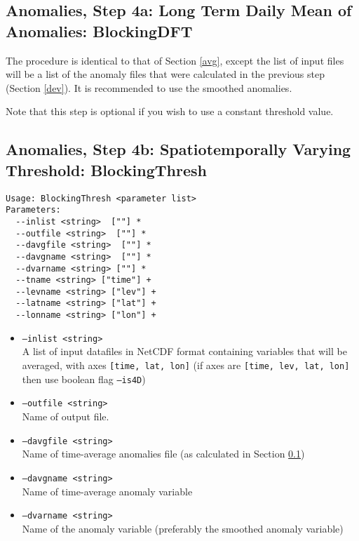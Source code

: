 \documentclass{article}
\begin{document}
\subsection{Anomalies, Step 4a: Long Term Daily Mean of Anomalies: BlockingDFT}\label{davg}

The procedure is identical to that of Section \ref{avg}, except the list of input files will be a list of the anomaly files that were calculated in the previous step (Section \ref{dev}). It is recommended to use the smoothed anomalies.

Note that this step is optional if you wish to use a constant threshold value.

\subsection{Anomalies, Step 4b: Spatiotemporally Varying Threshold: BlockingThresh}\label{thresh}

\begin{verbatim}
Usage: BlockingThresh <parameter list>
Parameters:
  --inlist <string>  [""] *
  --outfile <string>  [""] *
  --davgfile <string>  [""] *
  --davgname <string>  [""] *
  --dvarname <string> [""] *
  --tname <string> ["time"] +
  --levname <string> ["lev"] +
  --latname <string> ["lat"] +
  --lonname <string> ["lon"] +
\end{verbatim}

\begin{itemize}
\item[]\texttt{--inlist <string>} \\ A list of input datafiles in NetCDF format containing variables that will be averaged, with axes \texttt{[time, lat, lon]} (if axes are \texttt{[time, lev, lat, lon] } then use boolean flag \texttt{--is4D})
\item[]\texttt{--outfile <string>} \\ Name of output file.
\item[]\texttt{--davgfile <string>} \\ Name of time-average anomalies file (as calculated in Section \ref{davg})
\item[]\texttt{--davgname <string>} \\ Name of time-average anomaly variable
\item[]\texttt{--dvarname <string>} \\ Name of the anomaly variable (preferably the smoothed anomaly variable)
\end{itemize}
\end{document}
